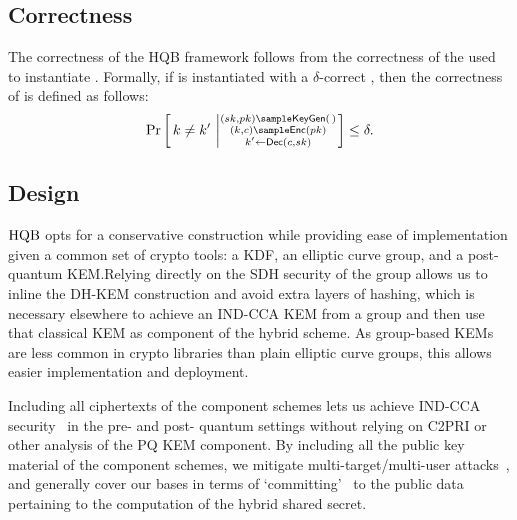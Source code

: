     \subsection{Correctness}
    The correctness of the HQB framework follows from the correctness of the
    \kem used to instantiate \hqb.
    Formally, if \hqb is instantiated with a $\delta$-correct \kem, then the
    correctness of \hqb is defined as follows:
    \[
        \Pr \left[\,  k \ne k' \, \left | \substack{(\sk, \pk) \sample \keygen(\,) \\ (k, c) \sample \enc(\pk) \\ k' \gets \dec(c, \sk) } \right. \right] \le \delta .
    \]

    \subsection{Design}

    $\text{HQB}$ opts for a conservative construction while providing ease of
    implementation given a common set of crypto tools: a KDF, an elliptic
    curve group, and a post-quantum KEM.Relying directly on the SDH security
    of the group allows us to inline the DH-KEM construction and avoid extra
    layers of hashing, which is necessary elsewhere to achieve an IND-CCA KEM
    from a group and then use that classical KEM as component of the hybrid
    scheme. As group-based KEMs are less common in crypto libraries than
    plain elliptic curve groups, this allows easier implementation and
    deployment.

    Including all ciphertexts of the component schemes lets us achieve
    IND-CCA security~\cite{PKC:GiaHeuPoe18} in the pre- and post- quantum
    settings without relying on C2PRI or other analysis of the PQ KEM
    component. By including all the public key material of the component
    schemes, we mitigate multi-target/multi-user
    attacks~\cite{EPRINT:GlaHovSte25}, and generally cover our bases in terms
    of `committing'~\cite{CCS:CreDaxMed24} to the public data pertaining to
    the computation of the hybrid shared secret.


